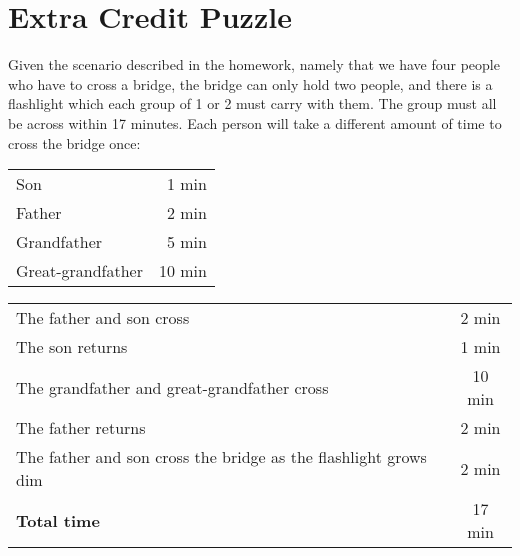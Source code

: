 \section*{Extra Credit Puzzle}

Given the scenario described in the homework, namely that we have four people who have to cross a bridge, the bridge can only hold two people, and there is a flashlight which each group of 1 or 2 must carry with them. The group must all be across within 17 minutes. Each person will take a different amount of time to cross the bridge once:

\begin{center}
\begin{tabular}{l r}
	\centering
	Son & 1 min \\
	Father & 2 min \\
	Grandfather & 5 min \\
	Great-grandfather & 10 min \\
\end{tabular}
\end{center}

\begin{center}
\begin{tabular}{l | c}
	The father and son cross & 2 min \\
	The son returns & 1 min \\
	The grandfather and great-grandfather cross & 10 min \\
	The father returns & 2 min \\
	The father and son cross the bridge as the flashlight grows dim & 2 min \\
	\hline
	\textbf{Total time} & 17 min
\end{tabular}
\end{center}
